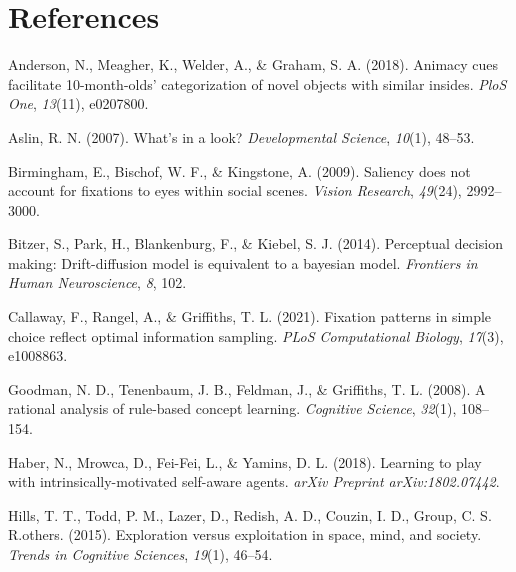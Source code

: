 \documentclass[10pt, letterpaper]{article}
\newenvironment{CSLReferences}%
  {}%
  {\par}
\begin{document}
\hypertarget{references}{%
\section{References}\label{references}}

\setlength{\parindent}{-0.1in} 
\setlength{\leftskip}{0.125in}

\noindent

\hypertarget{refs}{}
\begin{CSLReferences}{1}{0}
\leavevmode{}%
Anderson, N., Meagher, K., Welder, A., \& Graham, S. A. (2018). Animacy
cues facilitate 10-month-olds' categorization of novel objects with
similar insides. \emph{PloS One}, \emph{13}(11), e0207800.

\leavevmode{}%
Aslin, R. N. (2007). What's in a look? \emph{Developmental Science},
\emph{10}(1), 48--53.

\leavevmode{}%
Birmingham, E., Bischof, W. F., \& Kingstone, A. (2009). Saliency does
not account for fixations to eyes within social scenes. \emph{Vision
Research}, \emph{49}(24), 2992--3000.

\leavevmode{}%
Bitzer, S., Park, H., Blankenburg, F., \& Kiebel, S. J. (2014).
Perceptual decision making: Drift-diffusion model is equivalent to a
bayesian model. \emph{Frontiers in Human Neuroscience}, \emph{8}, 102.

\leavevmode{}%
Callaway, F., Rangel, A., \& Griffiths, T. L. (2021). Fixation patterns
in simple choice reflect optimal information sampling. \emph{PLoS
Computational Biology}, \emph{17}(3), e1008863.

\leavevmode{}%
Goodman, N. D., Tenenbaum, J. B., Feldman, J., \& Griffiths, T. L.
(2008). A rational analysis of rule-based concept learning.
\emph{Cognitive Science}, \emph{32}(1), 108--154.

\leavevmode{}%
Haber, N., Mrowca, D., Fei-Fei, L., \& Yamins, D. L. (2018). Learning to
play with intrinsically-motivated self-aware agents. \emph{arXiv
Preprint arXiv:1802.07442}.

\leavevmode{}%
Hills, T. T., Todd, P. M., Lazer, D., Redish, A. D., Couzin, I. D.,
Group, C. S. R.others. (2015). Exploration versus exploitation in space,
mind, and society. \emph{Trends in Cognitive Sciences}, \emph{19}(1),
46--54.


\end{CSLReferences}
\end{document}
